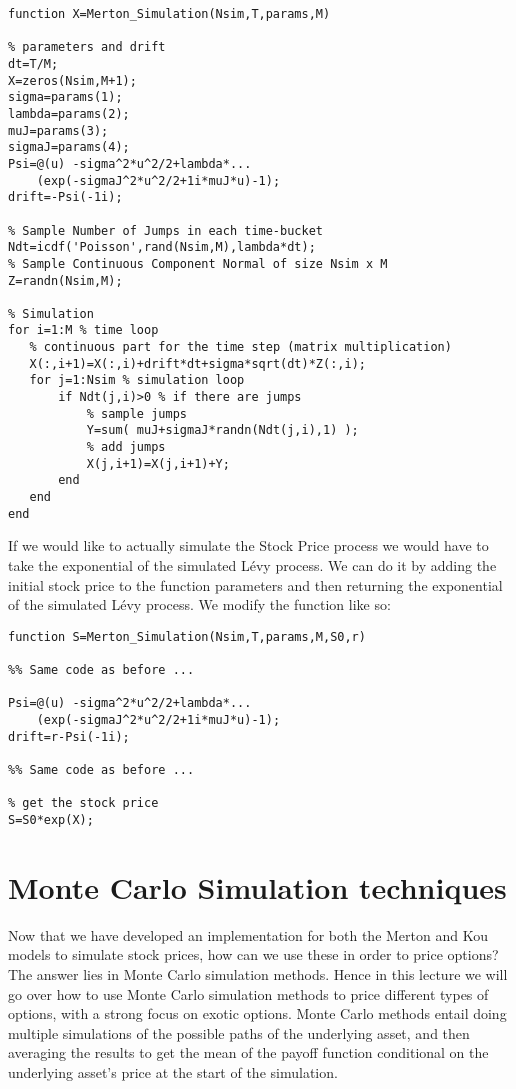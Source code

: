 \begin{verbatim}
function X=Merton_Simulation(Nsim,T,params,M)

% parameters and drift
dt=T/M;
X=zeros(Nsim,M+1);
sigma=params(1);
lambda=params(2);
muJ=params(3);
sigmaJ=params(4);
Psi=@(u) -sigma^2*u^2/2+lambda*...
    (exp(-sigmaJ^2*u^2/2+1i*muJ*u)-1);
drift=-Psi(-1i);

% Sample Number of Jumps in each time-bucket
Ndt=icdf('Poisson',rand(Nsim,M),lambda*dt);
% Sample Continuous Component Normal of size Nsim x M
Z=randn(Nsim,M);

% Simulation
for i=1:M % time loop
   % continuous part for the time step (matrix multiplication)
   X(:,i+1)=X(:,i)+drift*dt+sigma*sqrt(dt)*Z(:,i);
   for j=1:Nsim % simulation loop
       if Ndt(j,i)>0 % if there are jumps
           % sample jumps
           Y=sum( muJ+sigmaJ*randn(Ndt(j,i),1) );
           % add jumps
           X(j,i+1)=X(j,i+1)+Y;
       end
   end
end
\end{verbatim}

If we would like to actually simulate the Stock Price process we would have to
take the exponential of the simulated L\'evy process. We can do it by adding the
initial stock price to the function parameters and then returning the
exponential of the simulated L\'evy process. We modify the function like so:

\begin{verbatim}
function S=Merton_Simulation(Nsim,T,params,M,S0,r)

%% Same code as before ... 

Psi=@(u) -sigma^2*u^2/2+lambda*...
    (exp(-sigmaJ^2*u^2/2+1i*muJ*u)-1);
drift=r-Psi(-1i);

%% Same code as before ...

% get the stock price
S=S0*exp(X);

\end{verbatim}


\section{Monte Carlo Simulation techniques}

Now that we have developed an implementation for both the Merton and Kou models
to simulate stock prices, how can we use these in order to price options? The
answer lies in Monte Carlo simulation methods. Hence in this lecture we will go
over how to use Monte Carlo simulation methods to price different types of
options, with a strong focus on exotic options. Monte Carlo methods entail doing
multiple simulations of the possible paths of the underlying asset, and then
averaging the results to get the mean of the payoff function conditional on the
underlying asset's price at the start of the simulation.

